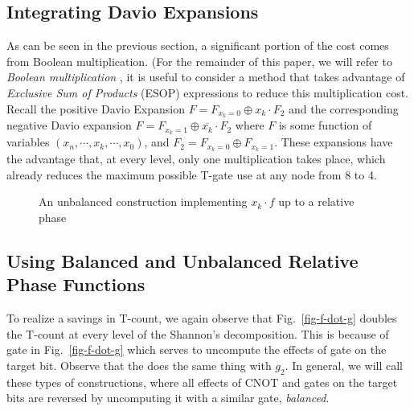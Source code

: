 \subsection{Integrating Davio Expansions}
\label{Subsec:davio}
As can be seen in the previous section, a significant portion of the cost comes from Boolean multiplication.
(For the remainder of this paper, we will refer to \emph{Boolean multiplication} 
, it is useful to consider a method that takes advantage of {\it Exclusive Sum of Products} (ESOP)
expressions to reduce this multiplication cost. Recall the positive Davio Expansion $F=F_{x_k=0}\oplus x_k \cdot F_2$ and the corresponding
negative Davio expansion $F=F_{x_k=1} \oplus \overline{x_k} \cdot F_2$ where $F$ is some function of variables $(x_n,\cdots,x_k,\cdots,x_0)$,
and $F_2 = F_{x_k=0} \oplus F_{x_k=1}$. These expansions have the advantage that, at every level, only one
multiplication takes place, which already reduces the maximum possible T-gate use at any node from
8 to 4. 

\begin{figure}[t]
    \centering
    \scalebox{0.8}{}
    \caption{An unbalanced construction implementing $x_k \cdot f$ up to a relative phase}
    \label{fig-urtof}
\end{figure}

\subsection{Using Balanced and Unbalanced Relative Phase Functions}
\label{Subsec:balanced}

To realize a savings in T-count, we again observe that Fig.~\ref{fig-f-dot-g} doubles the T-count
at every level of the Shannon's decomposition. This is because of gate  in Fig.~\ref{fig-f-dot-g} which
serves to uncompute the effects of gate  on the target bit. Observe that the 
does the same thing with $g_2$. In general, we will call these types of constructions, where all
effects of CNOT and  gates on the target bits are reversed by uncomputing it with a similar gate,
\emph{balanced}.

